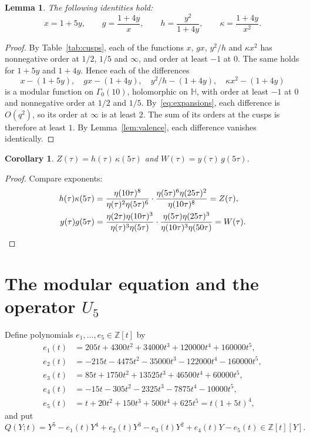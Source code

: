 \documentclass[11pt]{article}
\newtheorem{lemma}[theorem]{Lemma}
\newtheorem{corollary}[theorem]{Corollary}
\theoremstyle{definition}
\theoremstyle{remark}
\numberwithin{equation}{section}
\newcommand{\Z}{\mathbb{Z}}
\newcommand{\HH}{\mathbb{H}}
\begin{document}
\begin{lemma}\label{lem:ids}
The following identities hold:
\[
x=1+5y,\qquad g=\frac{1+4y}{x},\qquad h=\frac{y^2}{1+4y},\qquad \kappa=\frac{1+4y}{x^2}.
\]
\end{lemma}

\begin{proof}
By Table~\ref{tab:cusps}, each of the functions $x$, $gx$, $y^2/h$ and $\kappa x^2$ has nonnegative order at $1/2$, $1/5$ and $\infty$, and order at least $-1$ at $0$. The same holds for $1+5y$ and $1+4y$. Hence each of the differences
\[
x-(1+5y),\quad gx-(1+4y),\quad y^2/h-(1+4y),\quad \kappa x^2-(1+4y)
\]
is a modular function on $\Gamma_0(10)$, holomorphic on $\HH$, with order at least $-1$ at $0$ and nonnegative order at $1/2$ and $1/5$. By~\eqref{eq:expansions}, each difference is $O(q^2)$, so its order at $\infty$ is at least $2$. The sum of its orders at the cusps is therefore at least $1$. By Lemma~\ref{lem:valence}, each difference vanishes identically.
\end{proof}

\begin{corollary}\label{cor:factor}
$Z(\tau)=h(\tau)\,\kappa(5\tau)$ and $W(\tau)=y(\tau)\,g(5\tau)$.
\end{corollary}

\begin{proof}
Compare exponents:
\begin{align*}
h(\tau)\kappa(5\tau)&=\frac{\eta(10\tau)^{8}}{\eta(\tau)^{2}\eta(5\tau)^{6}}\cdot\frac{\eta(5\tau)^{6}\eta(25\tau)^{2}}{\eta(10\tau)^{8}}=Z(\tau),\\
y(\tau)g(5\tau)&=\frac{\eta(2\tau)\eta(10\tau)^3}{\eta(\tau)^{3}\eta(5\tau)}\cdot\frac{\eta(5\tau)\eta(25\tau)^3}{\eta(10\tau)^{3}\eta(50\tau)}=W(\tau).\qedhere
\end{align*}
\end{proof}

\section{The modular equation and the operator \texorpdfstring{$U_5$}{U5}}\label{sec:U5}

Define polynomials $e_1,\dots,e_5\in\Z[t]$ by
\begin{align*}
e_1(t)&=205t+4300t^2+34000t^3+120000t^4+160000t^5,\\
e_2(t)&=-215t-4475t^2-35000t^3-122000t^4-160000t^5,\\
e_3(t)&=85t+1750t^2+13525t^3+46500t^4+60000t^5,\\
e_4(t)&=-15t-305t^2-2325t^3-7875t^4-10000t^5,\\
e_5(t)&=t+20t^2+150t^3+500t^4+625t^5=t(1+5t)^4,
\end{align*}
and put
\begin{equation}\label{eq:Q}
Q(Y;t)=Y^5-e_1(t)Y^4+e_2(t)Y^3-e_3(t)Y^2+e_4(t)Y-e_5(t)\in\Z[t][Y].
\end{equation}
\end{document}
